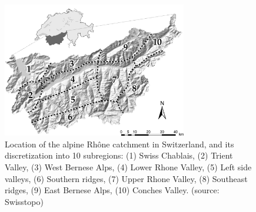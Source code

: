 \documentclass{ametsoc}
\begin{document}
%




%


\begin{figure}[t]
	\centerline{\includegraphics[width=19pc,angle=0]{fig01.pdf}}
	\caption{Location of the alpine Rh\^{o}ne catchment in Switzerland, and its discretization into 10 subregions:	(1) Swiss Chablais, (2) Trient Valley, (3) West Bernese Alps, (4) Lower Rhone Valley, (5) Left side valleys, (6) Southern ridges, (7) Upper Rhone Valley, (8) Southeast ridges, (9) East Bernese Alps, (10) Conches Valley. (source: Swisstopo)}
	\label{fig:map}
\end{figure}
\end{document}
